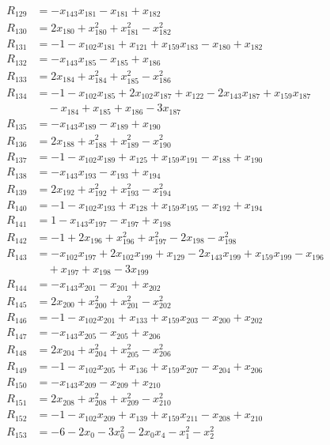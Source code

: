 \begin{align*}
R_{129}&=-x_{143}x_{181}-x_{181}+x_{182}\\
R_{130}&=2x_{180}+x_{180}^{2}+x_{181}^{2}-x_{182}^{2}\\
R_{131}&=-1-x_{102}x_{181}+x_{121}+x_{159}x_{183}-x_{180}+x_{182}\\
R_{132}&=-x_{143}x_{185}-x_{185}+x_{186}\\
R_{133}&=2x_{184}+x_{184}^{2}+x_{185}^{2}-x_{186}^{2}\\
R_{134}&=-1-x_{102}x_{185}+2x_{102}x_{187}+x_{122}-2x_{143}x_{187}+x_{159}x_{187}\\
&\quad{}-x_{184}+x_{185}+x_{186}-3x_{187}\\
R_{135}&=-x_{143}x_{189}-x_{189}+x_{190}\\
R_{136}&=2x_{188}+x_{188}^{2}+x_{189}^{2}-x_{190}^{2}\\
R_{137}&=-1-x_{102}x_{189}+x_{125}+x_{159}x_{191}-x_{188}+x_{190}\\
R_{138}&=-x_{143}x_{193}-x_{193}+x_{194}\\
R_{139}&=2x_{192}+x_{192}^{2}+x_{193}^{2}-x_{194}^{2}\\
R_{140}&=-1-x_{102}x_{193}+x_{128}+x_{159}x_{195}-x_{192}+x_{194}\\
R_{141}&=1-x_{143}x_{197}-x_{197}+x_{198}\\
R_{142}&=-1+2x_{196}+x_{196}^{2}+x_{197}^{2}-2x_{198}-x_{198}^{2}\\
R_{143}&=-x_{102}x_{197}+2x_{102}x_{199}+x_{129}-2x_{143}x_{199}+x_{159}x_{199}-x_{196}\\
&\quad{}+x_{197}+x_{198}-3x_{199}\\
R_{144}&=-x_{143}x_{201}-x_{201}+x_{202}\\
R_{145}&=2x_{200}+x_{200}^{2}+x_{201}^{2}-x_{202}^{2}\\
R_{146}&=-1-x_{102}x_{201}+x_{133}+x_{159}x_{203}-x_{200}+x_{202}\\
R_{147}&=-x_{143}x_{205}-x_{205}+x_{206}\\
R_{148}&=2x_{204}+x_{204}^{2}+x_{205}^{2}-x_{206}^{2}\\
R_{149}&=-1-x_{102}x_{205}+x_{136}+x_{159}x_{207}-x_{204}+x_{206}\\
R_{150}&=-x_{143}x_{209}-x_{209}+x_{210}\\
R_{151}&=2x_{208}+x_{208}^{2}+x_{209}^{2}-x_{210}^{2}\\
R_{152}&=-1-x_{102}x_{209}+x_{139}+x_{159}x_{211}-x_{208}+x_{210}\\
R_{153}&=-6-2x_{0}-3x_{0}^{2}-2x_{0}x_{4}-x_{1}^{2}-x_{2}^{2}\\

\end{align*}
